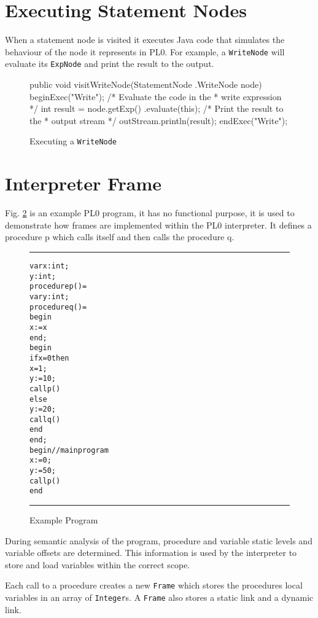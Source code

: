 \documentclass[a4paper,twoside,twocolumn]{article}
\begin{document}
\section{Executing Statement Nodes}\label{section:statements}
When a statement node is visited it executes Java code that simulates the
behaviour of the node it represents in PL0. For example, a \texttt{WriteNode}
will evaluate its \texttt{ExpNode} and print the result to the output.

\begin{figure}[H]
\begin{java}
public void visitWriteNode(StatementNode
        .WriteNode node) {
    beginExec("Write");
    /* Evaluate the code in the
     * write expression */
    int result = node.getExp()
            .evaluate(this);
    /* Print the result to the 
     * output stream */
    outStream.println(result);
    endExec("Write");
}
\end{java}
\caption{Executing a \texttt{WriteNode}}\label{figure:writenode}
\end{figure}

\section{Interpreter Frame}\label{section:frame}

Fig. \ref{figure:exampleprog} is an example PL0 program, it has no functional
purpose, it is used to demonstrate how frames are implemented within the PL0
interpreter. It defines a procedure p which calls itself and then calls the
procedure q.

\begin{figure}[H]
\rule{\columnwidth}{0.5pt}
\begin{alltt}
var x: int;
    y: int;
procedure p() =
  var y: int;
  procedure q() =
    begin
      x := x
    end;
  begin
    if x = 0 then
      x = 1;
      y := 10;
      call p()
    else
      y := 20;
      call q()
    end
  end;
begin // main program
  x := 0;
  y := 50;
  call p()
end
\end{alltt}
\rule{\columnwidth}{0.5pt}
\caption{Example Program}\label{figure:exampleprog}
\end{figure}

During semantic analysis of the program, procedure and variable static levels
and variable offsets are determined.
This information is used by the interpreter to store and load variables within
the correct scope.

Each call to a procedure creates a new \texttt{Frame} which stores the procedures
local variables in an array of \texttt{Integer}s. A \texttt{Frame} also stores
a static link and a dynamic link.
\end{document}
